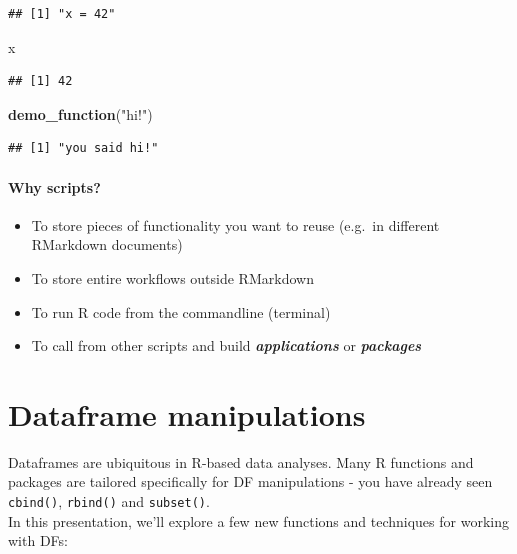 \documentclass[]{book}
\newenvironment{Shaded}{\begin{snugshade}}{\end{snugshade}}
\newcommand{\KeywordTok}[1]{\textcolor[rgb]{0.13,0.29,0.53}{\textbf{#1}}}
\newcommand{\NormalTok}[1]{#1}
\newcommand{\StringTok}[1]{\textcolor[rgb]{0.31,0.60,0.02}{#1}}
\providecommand{\tightlist}{%
  \setlength{\itemsep}{0pt}\setlength{\parskip}{0pt}}
\begin{document}
\begin{verbatim}
## [1] "x = 42"
\end{verbatim}

\begin{Shaded}
\begin{Highlighting}[]
\NormalTok{x}
\end{Highlighting}
\end{Shaded}

\begin{verbatim}
## [1] 42
\end{verbatim}

\begin{Shaded}
\begin{Highlighting}[]
\KeywordTok{demo_function}\NormalTok{(}\StringTok{"hi!"}\NormalTok{)}
\end{Highlighting}
\end{Shaded}

\begin{verbatim}
## [1] "you said hi!"
\end{verbatim}

\hypertarget{why-scripts}{%
\subsubsection*{Why scripts?}\label{why-scripts}}

\begin{itemize}
\tightlist
\item
  To store pieces of functionality you want to reuse (e.g.~in different RMarkdown documents)
\item
  To store entire workflows outside RMarkdown
\item
  To run R code from the commandline (terminal)
\item
  To call from other scripts and build \textbf{\emph{applications}} or \textbf{\emph{packages}}
\end{itemize}

\hypertarget{dataframe-manipulations-1}{%
\chapter{Dataframe manipulations}\label{dataframe-manipulations-1}}

Dataframes are ubiquitous in R-based data analyses. Many R functions and packages are tailored specifically for DF manipulations - you have already seen \texttt{cbind()}, \texttt{rbind()} and \texttt{subset()}.\\
In this presentation, we'll explore a few new functions and techniques for working with DFs:
\end{document}
